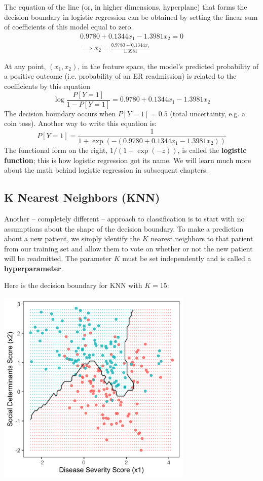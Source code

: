 \noindent The equation of the line (or, in higher dimensions, hyperplane) that forms the decision boundary in logistic regression can be obtained by setting the linear sum of coefficients of this model equal to zero. 
\begin{align*} 
0.9780 + 0.1344 x_1 - 1.3981 x_2 = 0 \\
\implies x_2 = \frac{0.9780 + 0.1344 x_1}{1.3981}
\end{align*}

\noindent At any point, $(x_1, x_2)$, in the feature space, the model's predicted probability of a positive outcome (i.e. probability of an ER readmission) is related to the coefficients by this equation
$$ \log \frac{P[Y=1]}{1 - P[Y=1]} = 0.9780 + 0.1344 x_1 - 1.3981 x_2 $$
The decision boundary occurs when $P[Y=1] = 0.5$ (total uncertainty, e.g. a coin toss). Another way to write this equation is:
$$ P[Y=1] = \frac{1}{1 + \exp(-(0.9780 + 0.1344 x_1 - 1.3981 x_2))} $$
The functional form on the right, $1/(1 + \exp(-z))$, is called the \textbf{logistic function}; this is how logistic regression got its name. We will learn much more about the math behind logistic regression in subsequent chapters. 

\subsection{K Nearest Neighbors (KNN)}

Another -- completely different -- approach to classification is to start with no assumptions about the shape of the decision boundary. To make a prediction about a new patient, we simply identify the $K$ nearest neighbors to that patient from our training set and allow them to vote on whether or not the new patient will be readmitted. The parameter $K$ must be set independently and is called a \textbf{hyperparameter}. 

\noindent Here is the decision boundary for KNN with $K=15$:
\begin{center}
\includegraphics[width=0.7\textwidth]{img/esl-knn-15.png}
\end{center}

